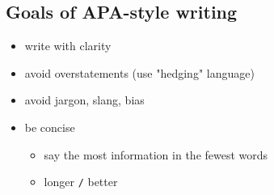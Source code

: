 \documentclass[11pt]{article}
\begin{document}
\subsection*{Goals of APA-style writing}
\label{sec-2-3}
\begin{itemize}
\item write with clarity
\item avoid overstatements (use "hedging" language)
\item avoid jargon, slang, bias
\item be concise
\begin{itemize}
\item say the most information in the fewest words
\item longer \texttt{/} better
\end{itemize}
\end{itemize}
\end{document}
